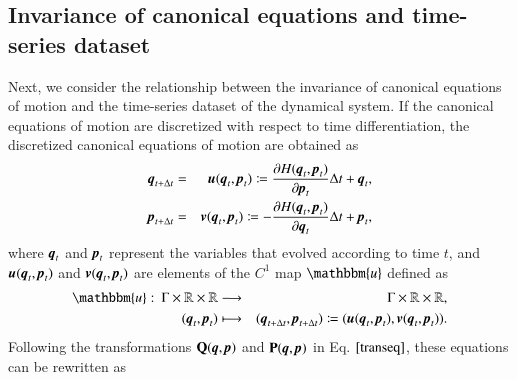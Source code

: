 \documentclass[preprint,
bibnotes,
 amsmath,amssymb,
 aps,
]{revtex4-1}
\begin{document}
\subsection{Invariance of canonical equations and time-series dataset}
Next, we consider the relationship between the invariance of canonical equations of motion and the time-series dataset of the dynamical system. 
If the canonical equations of motion are discretized with respect to time differentiation, the discretized canonical equations of motion are obtained as
\begin{eqnarray}
    {\textit{\textbf{q}}}_{t+\Delta t} &=&
    \textit{\textbf{u}}(\textit{\textbf{q}}_{t},\textit{\textbf{p}}_{t}) \coloneqq \frac{\partial{H(\textit{\textbf{q}}_{t},\textit{\textbf{p}}_{t})}}{\partial{\textit{\textbf{p}}_{t}}}\Delta t + \textit{\textbf{q}}_{t},\\
    {\textit{\textbf{p}}}_{t+\Delta t} &=& {\textit{\textbf{v}}}(\textit{\textbf{q}}_{t},\textit{\textbf{p}}_{t}) \coloneqq -\frac{\partial{H(\textit{\textbf{q}}_{t},\textit{\textbf{p}}_{t})}}{\partial{\textit{\textbf{q}}}_{t}}\Delta t + {\textit{\textbf{p}}}_{t},
\end{eqnarray}
where $\textit{\textbf{q}}_{t}$ and $\textit{\textbf{p}}_{t}$ represent the variables that evolved according to time $t$, and $\textit{\textbf{u}}(\textit{\textbf{q}}_{t},\textit{\textbf{p}}_{t})$ and $\textit{\textbf{v}}(\textit{\textbf{q}}_{t},\textit{\textbf{p}}_{t})$ are elements of the $C^1$ map $\mathbbm{u}$ defined as 
\begin{eqnarray}
\mathbbm{u}:\:\Gamma \times \mathbb{R} \times \mathbb{R} &\longrightarrow& \Gamma \times \mathbb{R} \times \mathbb{R},\\
\:(\textit{\textbf{q}}_{t}, \textit{\textbf{p}}_{t}) &\longmapsto& (\textit{\textbf{q}}_{t+\Delta t},\textit{\textbf{p}}_{t+\Delta t}) \coloneqq (\textit{\textbf{u}}(\textit{\textbf{q}}_{t},\textit{\textbf{p}}_{t}),\textit{\textbf{v}}(\textit{\textbf{q}}_{t},\textit{\textbf{p}}_{t})). 
\end{eqnarray}
Following the transformations $\mathbf{Q}(\textit{\textbf{q}},\textit{\textbf{p}})$ and $\mathbf{P}(\textit{\textbf{q}},\textit{\textbf{p}})$ in Eq. $\eqref{transeq}$, these equations can be rewritten as
\end{document}
